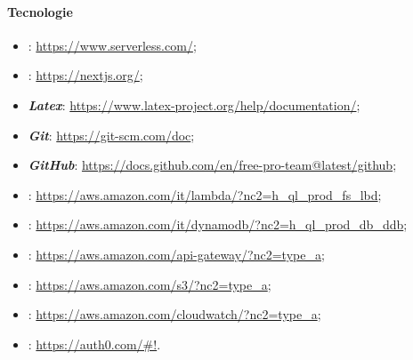 \paragraph{Tecnologie}
\begin{itemize}
    \item \textbf{}: \url{https://www.serverless.com/};
    \item \textbf{}: \url{https://nextjs.org/};
    \item \textbf{\textit{Latex}}: \url{https://www.latex-project.org/help/documentation/};
    \item \textbf{\textit{Git}}: \url{https://git-scm.com/doc};
    \item \textbf{\textit{GitHub}}: \url{https://docs.github.com/en/free-pro-team@latest/github};
    \item \textbf{}: \url{https://aws.amazon.com/it/lambda/?nc2=h_ql_prod_fs_lbd};
    \item \textbf{}: \url{https://aws.amazon.com/it/dynamodb/?nc2=h_ql_prod_db_ddb};
    \item \textbf{}: \url{https://aws.amazon.com/api-gateway/?nc2=type_a};
    \item \textbf{}: \url{https://aws.amazon.com/s3/?nc2=type_a};
    \item \textbf{}: \url{https://aws.amazon.com/cloudwatch/?nc2=type_a};
    \item \textbf{}: \url{https://auth0.com/#!}.
\end{itemize}